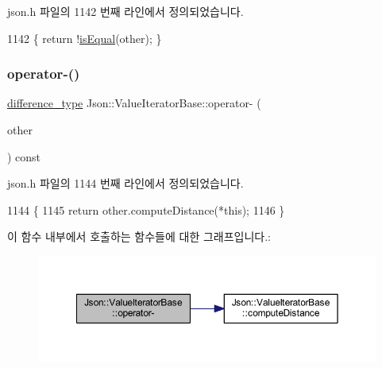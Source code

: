 json.\+h 파일의 1142 번째 라인에서 정의되었습니다.


\begin{DoxyCode}
1142 \{ \textcolor{keywordflow}{return} !\hyperlink{class_json_1_1_value_iterator_base_a010b5ad3f3337ae3732e5d7e16ca5e25}{isEqual}(other); \}
\end{DoxyCode}
\mbox{\label{class_json_1_1_value_iterator_base_a98e254263fca5f1fc8fcac7bcb0260bf}} 
\subsubsection{\texorpdfstring{operator-\/()}{operator-()}}
{\footnotesize\ttfamily \hyperlink{class_json_1_1_value_iterator_base_a4e44bf8cbd17ec8d6e2c185904a15ebd}{difference\+\_\+type} Json\+::\+Value\+Iterator\+Base\+::operator-\/ (\begin{DoxyParamCaption}\item[{const \hyperlink{class_json_1_1_value_iterator_base_a9d2a940d03ea06d20d972f41a89149ee}{Self\+Type} \&}]{other }\end{DoxyParamCaption}) const\hspace{0.3cm}{\ttfamily [inline]}}



json.\+h 파일의 1144 번째 라인에서 정의되었습니다.


\begin{DoxyCode}
1144                                                          \{
1145     \textcolor{keywordflow}{return} other.computeDistance(*\textcolor{keyword}{this});
1146   \}
\end{DoxyCode}
이 함수 내부에서 호출하는 함수들에 대한 그래프입니다.\+:
\nopagebreak
\begin{figure}[H]
\begin{center}
\leavevmode
\includegraphics[width=350pt]{class_json_1_1_value_iterator_base_a98e254263fca5f1fc8fcac7bcb0260bf_cgraph}
\end{center}
\end{figure}
\mbox{\label{class_json_1_1_value_iterator_base_a1248d8016f88b51371a0fcbd355b3cfd}} 
